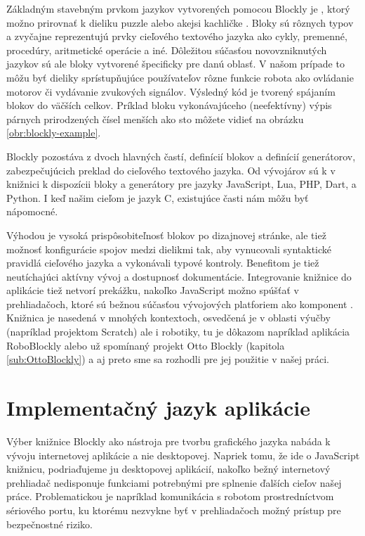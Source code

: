 Základným stavebným prvkom jazykov vytvorených pomocou Blockly je , ktorý možno prirovnať k dieliku puzzle alebo akejsi kachličke \cite{pasternak2017tips}. Bloky sú rôznych typov a zvyčajne reprezentujú prvky cieľového textového jazyka ako cykly, premenné, procedúry, aritmetické operácie a iné. Dôležitou súčasťou novovzniknutých jazykov sú ale bloky vytvorené špecificky pre danú oblasť. V našom prípade to môžu byť dieliky sprístupňujúce používateľov rôzne funkcie robota ako ovládanie motorov či vydávanie zvukových signálov. Výsledný kód je tvorený spájaním blokov do väčších celkov. Príklad bloku vykonávajúceho (neefektívny) výpis párnych prirodzených čísel menších ako sto môžete vidieť na obrázku \ref{obr:blockly-example}.

Blockly pozostáva z dvoch hlavných častí, definícií blokov a definícií generátorov, zabezpečujúcich preklad do cieľového textového jazyka. Od vývojárov sú k v knižnici k dispozícii  bloky a generátory pre jazyky JavaScript, Lua, PHP, Dart, a Python. I keď našim cieľom je jazyk C, existujúce časti nám môžu byť nápomocné.

Výhodou je vysoká prispôsobiteľnosť blokov po dizajnovej stránke, ale tiež možnosť konfigurácie spojov medzi dielikmi tak, aby vynucovali syntaktické pravidlá cieľového jazyka a vykonávali typové kontroly. Benefitom je tiež neutíchajúci aktívny vývoj a dostupnosť dokumentácie. Integrovanie knižnice do aplikácie tiež netvorí prekážku, nakoľko JavaScript možno spúšťať v prehliadačoch, ktoré sú bežnou súčasťou vývojových platforiem ako komponent . Knižnica je nasedená v mnohých kontextoch, osvedčená je v oblasti výučby (napríklad projektom Scratch) ale i robotiky, tu je dôkazom napríklad aplikácia RoboBlockly alebo už spomínaný projekt Otto Blockly (kapitola \ref{sub:OttoBlockly}) a aj preto sme sa rozhodli pre jej použitie v našej práci.


\section{Implementačný jazyk aplikácie}
Výber knižnice Blockly ako nástroja pre tvorbu grafického jazyka nabáda k vývoju internetovej aplikácie a nie desktopovej. Napriek tomu, že ide o JavaScript knižnicu, podriaďujeme ju desktopovej aplikácií, nakoľko bežný internetový prehliadač nedisponuje funkciami potrebnými pre splnenie ďalších cieľov našej práce. Problematickou je napríklad komunikácia s robotom prostredníctvom sériového portu, ku ktorému nezvykne byť v prehliadačoch možný prístup pre bezpečnostné riziko. 

